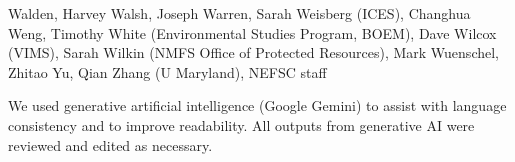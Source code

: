 \documentclass[
  10pt,
]{article}
\begin{document}
Walden, Harvey Walsh, Joseph Warren, Sarah Weisberg (ICES), Changhua Weng, Timothy White (Environmental Studies Program, BOEM), Dave Wilcox (VIMS), Sarah Wilkin (NMFS Office of Protected Resources), Mark Wuenschel, Zhitao Yu, Qian Zhang (U Maryland), NEFSC staff

We used generative artificial intelligence (Google Gemini) to assist with language consistency and to improve readability. All outputs from generative AI were reviewed and edited as necessary.
\end{document}
